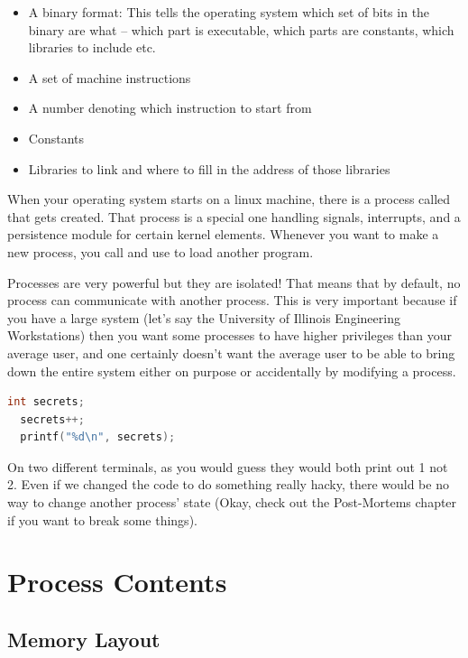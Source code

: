 \begin{itemize}
\item A binary format: This tells the operating system which set of bits in the binary are what -- which part is executable, which parts are constants, which libraries to include etc. 
\item A set of machine instructions 
\item A number denoting which instruction to start from
\item Constants
\item Libraries to link and where to fill in the address of those libraries
\end{itemize}

When your operating system starts on a linux machine, there is a process called  that gets created.
That process is a special one handling signals, interrupts, and a persistence module for certain kernel elements.
Whenever you want to make a new process, you call  and use  to load another program.

Processes are very powerful but they are isolated!
That means that by default, no process can communicate with another process.
This is very important because if you have a large system (let's say the University of Illinois Engineering Workstations) then you want some processes to have higher privileges than your average user, and one certainly doesn't want the average user to be able to bring down the entire system either on purpose or accidentally by modifying a process.

\begin{lstlisting}[language=C]
  int secrets;
  secrets++;
  printf("%d\n", secrets);
\end{lstlisting}

On two different terminals, as you would guess they would both print out 1 not 2.
Even if we changed the code to do something really hacky, there would be no way to change another process' state (Okay, check out the Post-Mortems chapter if you want to break some things).

\section{Process Contents}

\subsection{Memory Layout}

